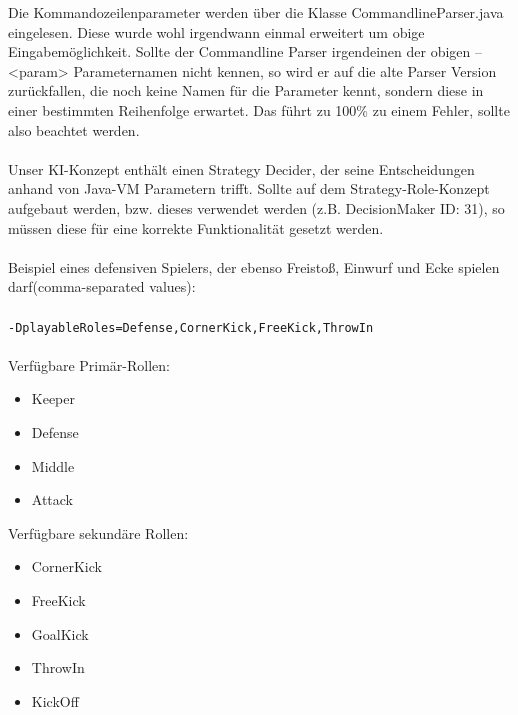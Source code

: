 \documentclass[fontsize=12pt,a4paper,final]{scrartcl}[2003/01/01]
\begin{document}
Die Kommandozeilenparameter werden über die Klasse CommandlineParser.java eingelesen. Diese wurde wohl irgendwann einmal erweitert um obige Eingabemöglichkeit. Sollte der Commandline Parser irgendeinen der obigen --<param> Parameternamen nicht kennen, so wird er auf die alte Parser Version zurückfallen, die noch keine Namen für die Parameter kennt, sondern diese in einer bestimmten Reihenfolge erwartet. Das führt zu 100\% zu einem Fehler, sollte also beachtet werden.\\
\\
Unser KI-Konzept enthält einen Strategy Decider, der seine Entscheidungen anhand von Java-VM Parametern trifft. Sollte auf dem Strategy-Role-Konzept aufgebaut werden, bzw. dieses verwendet werden (z.B. DecisionMaker ID: 31), so müssen diese für eine korrekte Funktionalität gesetzt werden.\\
\\
Beispiel eines defensiven Spielers, der ebenso Freistoß, Einwurf und Ecke spielen darf(comma-separated values):\\
\\
\texttt{-DplayableRoles=Defense,CornerKick,FreeKick,ThrowIn}\\
\\
Verfügbare Primär-Rollen:
\begin{itemize}
\item Keeper
\item Defense
\item Middle
\item Attack
\end{itemize}

Verfügbare sekundäre Rollen:
\begin{itemize}
\item CornerKick
\item FreeKick
\item GoalKick
\item ThrowIn
\item KickOff
\end{itemize}
\end{document}
